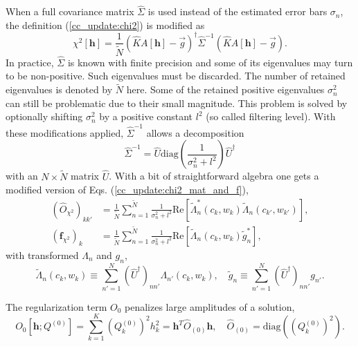 \documentclass[]{article}
\begin{document}
When a full covariance matrix $\hat{\Sigma}$ is used instead of the estimated error bars $\sigma_n$, the definition (\ref{cc_update:chi2}) is modified as
\begin{equation}\label{cc_update:chi2_cov_matrix}
    \chi^2[\mathbf{h}] = \frac{1}{\tilde N}
    (\hat K A[\mathbf{h}] - \vec g)^\dagger
    \hat\Sigma^{-1}
    (\hat K A[\mathbf{h}] - \vec g).
\end{equation}
In practice, $\hat{\Sigma}$ is known with finite precision and some of its eigenvalues may turn to be non-positive. Such eigenvalues must be discarded. The number of retained eigenvalues is denoted by $\tilde N$ here. Some of the retained positive eigenvalues $\sigma_n^2$ can still be problematic due to their small magnitude. This problem is solved by optionally shifting $\sigma_n^2$ by a positive constant $l^2$ (so called filtering level). With these modifications applied, $\hat\Sigma^{-1}$ allows a decomposition
\begin{equation}
    \hat\Sigma^{-1} = \hat U \mathrm{diag}
                      \left(\frac{1}{\sigma_n^2 + l^2}\right)
                      \hat U^\dagger
\end{equation}
with an $N\times \tilde N$ matrix $\hat U$. With a bit of straightforward algebra one gets a modified version of Eqs. (\ref{cc_update:chi2_mat_and_f}),
\begin{align}
    (\hat O_{\chi^2})_{kk'} &= \frac{1}{\tilde N} \sum_{n=1}^{\tilde N} \frac{1}{\sigma_n^2 + l^2}
    \mathrm{Re}\left[
    \tilde\Lambda^*_n(c_k, w_k) \tilde\Lambda_n(c_{k'}, w_{k'})
    \right],\\
    (\mathbf{f}_{\chi^2})_k &= \frac{1}{\tilde N} \sum_{n=1}^{\tilde N} \frac{1}{\sigma_n^2 + l^2}
    \mathrm{Re}\left[\tilde\Lambda_n(c_k, w_k) \tilde g_n^*\right],
\end{align}
with transformed $\Lambda_n$ and $g_n$,
\begin{equation}
    \tilde\Lambda_n(c_k, w_k) \equiv
    \sum_{n'=1}^N (\hat U^\dagger)_{nn'} \Lambda_{n'}(c_k, w_k),\quad
    \tilde g_n \equiv
    \sum_{n'=1}^N (\hat U^\dagger)_{nn'} g_{n'}.
\end{equation}

The regularization term $O_0$ penalizes large amplitudes of a solution,
\begin{equation}
    O_0[\mathbf{h};Q^{(0)}] = \sum_{k=1}^K (Q^{(0)}_k)^2 h_k^2 =
        \mathbf{h}^T \hat O_{(0)} \mathbf{h}, \quad
        \hat O_{(0)} = \mathrm{diag}((Q^{(0)}_k)^2).
\end{equation}
\end{document}
